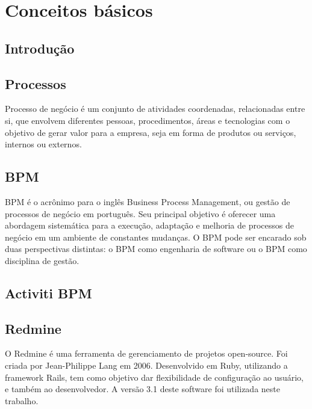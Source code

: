 \chapter{Conceitos básicos}\label{chp:conceitos_basicos}

\section{Introdução}\label{sec:conceitos_basicos-introducao}

\section{Processos}\label{sec:conceitos_basicos-processos}
Processo de negócio é um conjunto de atividades coordenadas, relacionadas entre si, que envolvem diferentes pessoas, procedimentos, áreas e tecnologias com o objetivo de gerar valor para a empresa, seja em forma de produtos ou serviços, internos ou externos.

\section{BPM}\label{sec:conceitos_basicos-bpm}
BPM é o acrônimo para o inglês Business Process Management, ou gestão de processos de negócio em português. Seu principal objetivo é oferecer uma abordagem sistemática para a execução, adaptação e melhoria de processos de negócio em um ambiente de constantes mudanças. O BPM pode ser encarado sob duas perspectivas distintas: o BPM como engenharia de software ou o BPM como disciplina de gestão.

\section{Activiti BPM}\label{sec:conceitos_basicos-activiti}


\section{Redmine}\label{sec:conceitos_basicos-redmine}
O Redmine é uma ferramenta de gerenciamento de projetos open-source. Foi criada por Jean-Philippe Lang em 2006. Desenvolvido em Ruby, utilizando a framework Rails, tem como objetivo dar flexibilidade de configuração ao usuário, e também ao desenvolvedor. A versão 3.1 deste software foi utilizada neste trabalho.


